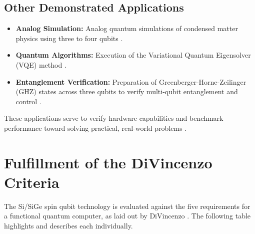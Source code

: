 \subsection{Other Demonstrated Applications}
\begin{itemize}
    \item \textbf{Analog Simulation:} Analog quantum simulations of condensed matter physics using three to four qubits \cite{ref9}.
    \item \textbf{Quantum Algorithms:} Execution of the Variational Quantum Eigensolver (VQE) method \cite{ref9}.
    \item \textbf{Entanglement Verification:} Preparation of Greenberger-Horne-Zeilinger (GHZ) states across three qubits to verify multi-qubit entanglement and control \cite{ref11}.
\end{itemize}
These applications serve to verify hardware capabilities and benchmark performance toward solving practical, real-world problems \cite{ref2, ref9}.
\section{Fulfillment of the DiVincenzo Criteria}
The Si/SiGe spin qubit technology is evaluated against the five requirements for a functional quantum computer, as laid out by DiVincenzo \cite{ref12}. The following table highlights and describes each individually.

